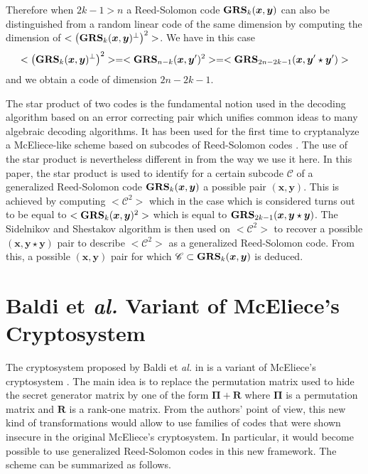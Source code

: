 \documentclass[runningheads,11pt]{llncs}
\newcommand{\code}[1]{\ensuremath{\mathscr{#1}}}
\newcommand{\word}[1]{\ensuremath{\boldsymbol{#1}}}
\newcommand{\xv}{\word{x}}
\newcommand{\yv}{\word{y}}
\newcommand{\mat}[1]{\ensuremath{\boldsymbol{#1}}}
\newcommand{\Pim}{\mat{\Pi}}
\newcommand{\Rm}{\mat{R}}
\newcommand{\GRS}[3]{\text{\bf GRS}_{#1}(#2,#3)}
\begin{document}
 Therefore when $2k-1 > n$ a Reed-Solomon code $\GRS{k}{\xv}{\yv}$ can also be distinguished from 
 a random linear code of the same dimension by computing the dimension of
 $<\left(\GRS{k}{\xv}{\yv}^\perp\right)^2>$. We have in this case
 $$<\left(\GRS{k}{\xv}{\yv}^\perp\right)^2>
 =<\GRS{n-k}{\xv}{\yv'}^2>
 = <\GRS{2n-2k-1}{\xv}{\yv'\star\yv'}>
 $$
 and we obtain a code of dimension $2n-2k-1$.

 The star product of two codes is the fundamental notion used in the decoding algorithm based on an error correcting pair
 \cite{Pel92,Kot92a} which unifies common ideas to many algebraic
 decoding algorithms. It has been used for the first time to 
cryptanalyze a McEliece-like scheme \cite{BL05} based on subcodes of Reed-Solomon codes
 \cite{Wie10}. The use of the star product is nevertheless different in \cite{Wie10} from the way we use it here. In this paper,
 the star product is used to identify  for a certain subcode  $\code{C}$ of a generalized Reed-Solomon code $\GRS{k}{\xv}{\yv}$
 a possible pair $(\xv,\yv)$. This is achieved by computing $<\code{C}^2>$ which in the case which is considered turns out to 
 be equal to $<\GRS{k}{\xv}{\yv}^2>$ which is equal to $\GRS{2k-1}{\xv}{\yv \star \yv}$. The Sidelnikov and Shestakov algorithm is then 
 used on  $<\code{C}^2>$ to recover a possible $(\xv,\yv\star\yv)$ pair to describe $<\code{C}^2>$ as a generalized Reed-Solomon
 code. From this, a possible $(\xv,\yv)$ pair for which $\code{C} \subset \GRS{k}{\xv}{\yv}$ is deduced.


\section{Baldi et \textit{al.} Variant of McEliece's Cryptosystem} \label{sec:schemeit}

The cryptosystem proposed by Baldi et \textit{al.}  in \cite{BBCRS11a} is a variant of McEliece's cryptosystem \cite{McEliece78}. The main idea is to replace the permutation matrix used to hide the secret generator matrix by one of the form $ \Pim + \Rm$ where
$\Pim$ is a permutation matrix and $\Rm$ is a rank-one matrix. From
the authors' point of view, this new kind of transformations would
allow to use  families of codes that were shown insecure in the
original McEliece's cryptosystem. In particular, it would become possible to use generalized Reed-Solomon codes in this new framework.
The scheme can be summarized as follows.
\end{document}
